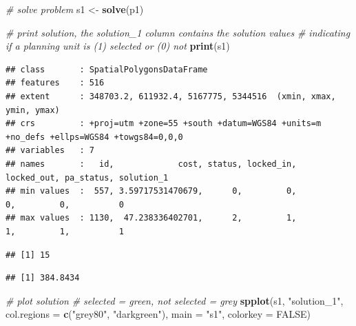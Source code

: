 \documentclass[12pt,]{book}
\newenvironment{Shaded}{\begin{snugshade}}{\end{snugshade}}
\newcommand{\KeywordTok}[1]{\textcolor[rgb]{0.13,0.29,0.53}{\textbf{#1}}}
\newcommand{\DataTypeTok}[1]{\textcolor[rgb]{0.13,0.29,0.53}{#1}}
\newcommand{\DecValTok}[1]{\textcolor[rgb]{0.00,0.00,0.81}{#1}}
\newcommand{\StringTok}[1]{\textcolor[rgb]{0.31,0.60,0.02}{#1}}
\newcommand{\CommentTok}[1]{\textcolor[rgb]{0.56,0.35,0.01}{\textit{#1}}}
\newcommand{\OtherTok}[1]{\textcolor[rgb]{0.56,0.35,0.01}{#1}}
\newcommand{\OperatorTok}[1]{\textcolor[rgb]{0.81,0.36,0.00}{\textbf{#1}}}
\newcommand{\NormalTok}[1]{#1}
\begin{document}
\begin{Shaded}
\begin{Highlighting}[]
\CommentTok{# solve problem}
\NormalTok{s1 <-}\StringTok{ }\KeywordTok{solve}\NormalTok{(p1)}

\CommentTok{# print solution, the solution_1 column contains the solution values}
\CommentTok{# indicating if a planning unit is (1) selected or (0) not}
\KeywordTok{print}\NormalTok{(s1)}
\end{Highlighting}
\end{Shaded}

\begin{verbatim}
## class       : SpatialPolygonsDataFrame 
## features    : 516 
## extent      : 348703.2, 611932.4, 5167775, 5344516  (xmin, xmax, ymin, ymax)
## crs         : +proj=utm +zone=55 +south +datum=WGS84 +units=m +no_defs +ellps=WGS84 +towgs84=0,0,0 
## variables   : 7
## names       :   id,             cost, status, locked_in, locked_out, pa_status, solution_1 
## min values  :  557, 3.59717531470679,      0,         0,          0,         0,          0 
## max values  : 1130,  47.238336402701,      2,         1,          1,         1,          1
\end{verbatim}

\begin{Shaded}
\end{Shaded}

\begin{verbatim}
## [1] 15
\end{verbatim}

\begin{Shaded}
\end{Shaded}

\begin{verbatim}
## [1] 384.8434
\end{verbatim}

\begin{Shaded}
\begin{Highlighting}[]
\CommentTok{# plot solution}
\CommentTok{# selected = green, not selected = grey}
\KeywordTok{spplot}\NormalTok{(s1, }\StringTok{"solution_1"}\NormalTok{, }\DataTypeTok{col.regions =} \KeywordTok{c}\NormalTok{(}\StringTok{"grey80"}\NormalTok{, }\StringTok{"darkgreen"}\NormalTok{), }\DataTypeTok{main =} \StringTok{"s1"}\NormalTok{,}
       \DataTypeTok{colorkey =} \OtherTok{FALSE}\NormalTok{)}
\end{Highlighting}
\end{Shaded}
\end{document}
